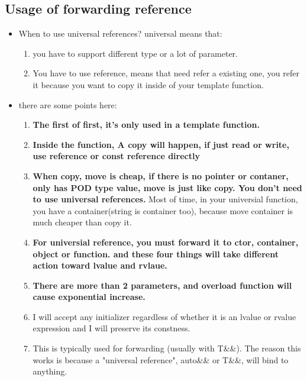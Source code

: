 \documentclass[a4paper,11pt,twoside]{book}
\begin{document}
\subsection{Usage of forwarding reference}
\begin{itemize}
\item When to use universal references? universal means that:
\begin{enumerate}
	\item you have to support different type or a lot of parameter. 
	\item You have to use reference, means that need refer a existing one, you refer it because you want to copy it inside of your template function. 
\end{enumerate}

\item there are some points here:
	\begin{enumerate}
		\item \textbf{The first of first, it's only used in a template function.}
		
		\item \textbf{Inside the function, A copy will happen, if just read or write, use reference or const reference directly}
		
		\item \textbf{When copy, move is cheap, if there is no pointer or contaner, only has POD type value, move is just like copy. You don't need to use universal references.} Most of time, in your universial function, you have a container(string is container too), because move container is much cheaper than copy it.
		
		\item \textbf{For universial reference, you must forward it to ctor, container, object or function. and these four things will take different action toward lvalue and rvlaue.}
		
		\item \textbf{There are more than 2 parameters, and overload function will cause exponential increase.}

		\item I will accept any initializer regardless of whether it is an lvalue or rvalue expression and I will preserve its constness. 

		\item This is typically used for forwarding (usually with T\&\&). The reason this works is because a "universal reference", auto\&\& or T\&\&, will bind to anything.  


\end{enumerate}
\end{itemize}
\end{document}
